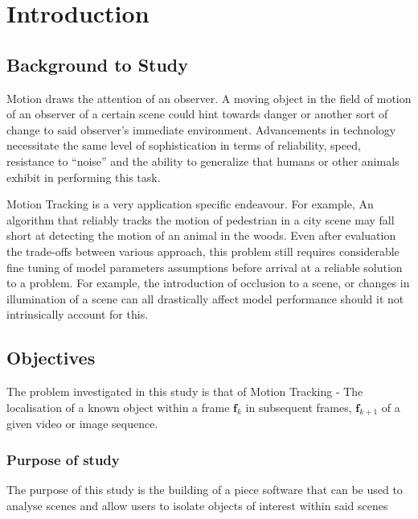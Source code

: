 \chapter{Introduction}

\section{Background to Study}
Motion draws the attention of an observer. A moving object in the field of
motion of an observer of a certain scene could hint towards danger or another
sort of change to said observer's immediate environment. Advancements in
technology necessitate the same level of sophistication in terms of
reliability, speed, resistance to ``noise'' and the ability to generalize that
humans or other animals exhibit in performing this task.

Motion Tracking is a very application specific endeavour. For example, An
algorithm that
reliably tracks the motion of pedestrian in a city scene may fall short at
detecting the motion of an animal in the woods. Even after evaluation the
trade-offs between various approach, this problem still requires considerable fine
tuning of model parameters assumptions before arrival at a reliable solution
to a problem.  For example, the introduction of occlusion to a scene, or changes
in illumination of a scene can all drastically affect model performance should
it not intrinsically account for this.

\section{Objectives}\label{introduction_objectives}
The problem investigated in this study is that of Motion Tracking - The
localisation of a known object within a frame $\mathbf{f}_k$ in subsequent
frames, $\mathbf{f}_{k+1}$ of a given video or image sequence.  

\subsection{Purpose of study}
The purpose of this study is the building of a piece software that can be used
to analyse scenes and allow users to isolate objects of interest within said
scenes

